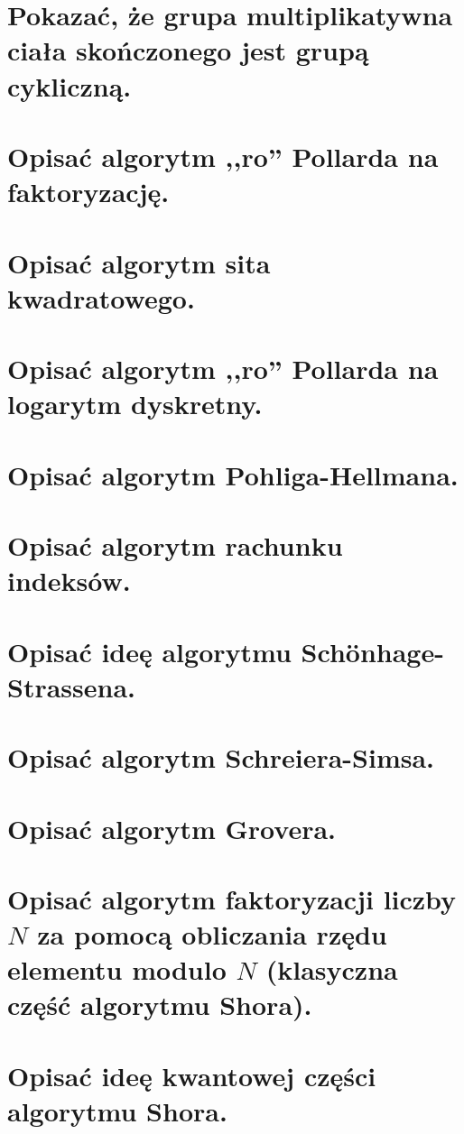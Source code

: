 \section{Pokazać, że grupa multiplikatywna ciała skończonego jest grupą cykliczną.}


\section{Opisać algorytm ,,ro'' Pollarda na faktoryzację.}
\label{C:rho_factorization}


\section{Opisać algorytm sita kwadratowego.}


\section{Opisać algorytm ,,ro'' Pollarda na logarytm dyskretny.}



\section{Opisać algorytm Pohliga-Hellmana.}


\section{Opisać algorytm rachunku indeksów.}


\section{Opisać ideę algorytmu Sch{\"o}nhage-Strassena.}


\section{Opisać algorytm Schreiera-Simsa.}


\section{Opisać algorytm Grovera.}


\section{Opisać algorytm faktoryzacji liczby \( N \) za pomocą obliczania rzędu elementu modulo \( N \) (klasyczna część algorytmu Shora).}


\section{Opisać ideę kwantowej części algorytmu Shora.}
